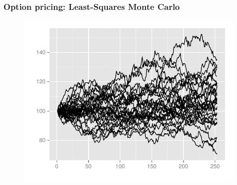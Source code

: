 \documentclass{beamer}
\begin{document}

\begin{frame}
  \frametitle{Option pricing: Least-Squares Monte Carlo}
   \begin{figure}
       \centering
       \includegraphics[width=\textwidth]{graphics/lsmplot.pdf}
       \vspace{-5mm}
       \caption{}
   \label{fig:2dsobolseq}
 \end{figure}  
\end{frame}
\end{document}
